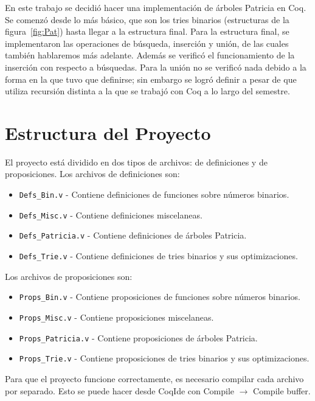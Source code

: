 \documentclass[11pt,letterpaper]{article}
\begin{document}
En este trabajo se decidió hacer una implementación de árboles Patricia en Coq. Se comenzó desde lo más básico, que son los tries binarios (estructuras de la figura~\ref{fig:Pat}) hasta llegar a la estructura final. Para la estructura final, se implementaron las operaciones de búsqueda, inserción y unión, de las cuales también hablaremos más adelante. Además se verificó el funcionamiento de la inserción con respecto a búsquedas. Para la unión no se verificó nada debido a la forma en la que tuvo que definirse; sin embargo se logró definir a pesar de que utiliza recursión distinta a la que se trabajó con Coq a lo largo del semestre.

\section{Estructura del Proyecto}

\noindent El proyecto está dividido en dos tipos de archivos: de definiciones y de proposiciones. Los archivos de definiciones son:

\begin{itemize}
\item \texttt{Defs\_Bin.v} - Contiene definiciones de funciones sobre números binarios.
\item \texttt{Defs\_Misc.v} - Contiene definiciones miscelaneas.
\item \texttt{Defs\_Patricia.v} - Contiene definiciones de árboles Patricia.
\item \texttt{Defs\_Trie.v} - Contiene definiciones de tries binarios y sus optimizaciones.
\end{itemize}

Los archivos de proposiciones son:

\begin{itemize}
\item \texttt{Props\_Bin.v} - Contiene proposiciones de funciones sobre números binarios.
\item \texttt{Props\_Misc.v} - Contiene proposiciones miscelaneas.
\item \texttt{Props\_Patricia.v} - Contiene proposiciones de árboles Patricia.
\item \texttt{Props\_Trie.v} - Contiene proposiciones de tries binarios y sus optimizaciones.
\end{itemize}

Para que el proyecto funcione correctamente, es necesario compilar cada archivo por separado. Esto se puede hacer desde CoqIde con Compile $\rightarrow$ Compile buffer.
\end{document}

